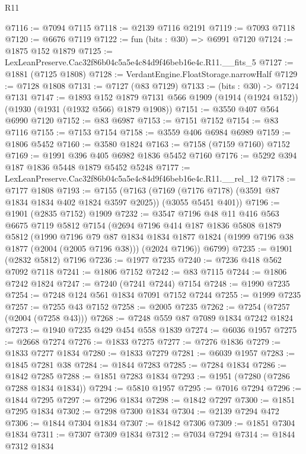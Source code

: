 \begin{lexlean}{R11}
\begin{coremodule}
@7116 := @7094 @7115
@7118 := @2139 @7116 @2191
@7119 := @7093 @7118
@7120 := @6676 @7119
@7122 := fun (bits : @30) => @6991 @7120
@7124 := @1875 @152 @1879
@7125 := LexLeanPreserve.Cac32f86b04c5a5e4c84d9f46beb16e4c.R11.__fits_5
@7127 := @1881 (@7125 @1808)
@7128 := VerdantEngine.FloatStorage.narrowHalf
@7129 := @7128 @1808
@7131 := @7127 (@83 @7129)
@7133 := (bits : @30) -> @7124 @7131
@7147 := @1893
    @152
    @1879
    @7131
    @566
    @1909
    (@1914 (@1924 @152))
    (@1930 (@1931 (@1932 @566) @1879 @1908))
@7151 := @3550 @407 @564 @6990 @7120
@7152 := @83 @6987
@7153 := @7151 @7152
@7154 := @83 @7116
@7155 := @7153 @7154
@7158 := @3559 @406 @6984 @6989
@7159 := @1806 @5452
@7160 := @3580 @1824
@7163 := @7158 (@7159 @7160) @7152
@7169 := @1991 @396 @405 @6982 @1836 @5452 @7160
@7176 := @5292 @394 @187 @1836 @5448 @1879 @5452 @5248
@7177 := LexLeanPreserve.Cac32f86b04c5a5e4c84d9f46beb16e4c.R11.__rel_12
@7178 := @7177 @1808
@7193 := @7155
    (@7163 (@7169 (@7176 @7178) (@3591 @87 @1834 @1834 @402 @1824 @3597 @2025)) (@3055 @5451 @401))
@7196 := @1901 (@2835 @7152) @1909
@7232 := @3547
    @7196
    @48
    @11
    @416
    @563
    @6675
    @7119
    @5812
    @7154
    (@2694
      @7196
      @414
      @187
      @1836
      @5808
      @1879
      @5812
      (@1990
        @7196
        @79
        @87
        @1834
        @1834
        @1877
        @1824
        (@1999 @7196 @38 @1877 (@2004 (@2005 @7196 @38)))
        (@2024 @7196))
      @6799)
@7235 := @1901 (@2832 @5812) @7196
@7236 := @1977 @7235
@7240 := @7236 @418 @562 @7092 @7118
@7241 := @1806 @7152
@7242 := @83 @7115
@7244 := @1806 @7242 @1824
@7247 := @7240 (@7241 @7244) @7154
@7248 := @1990 @7235
@7254 := @7248 @124 @561 @1834 @7091 @7152 @7244
@7255 := @1999 @7235
@7257 := @7255 @43 @7152
@7258 := @2005 @7235
@7262 := @7254 (@7257 (@2004 (@7258 @43)))
@7268 := @7248 @559 @87 @7089 @1834 @7242 @1824
@7273 := @1940 @7235 @429 @454 @558 @1839
@7274 := @6036 @1957
@7275 := @2668 @7274
@7276 := @1833 @7275
@7277 := @7276 @1836
@7279 := @1833 @7277 @1834
@7280 := @1833 @7279
@7281 := @6039 @1957
@7283 := @1845 @7281 @38
@7284 := @1844 @7283
@7285 := @7284 @1834
@7286 := @1842 @7285
@7288 := @1851 @7283 @1834
@7293 := @1951 (@7280 (@7286 @7288 @1834 @1834))
@7294 := @5810 @1957
@7295 := @7016 @7294
@7296 := @1844 @7295
@7297 := @7296 @1834
@7298 := @1842 @7297
@7300 := @1851 @7295 @1834
@7302 := @7298 @7300 @1834
@7304 := @2139 @7294 @472
@7306 := @1844 @7304 @1834
@7307 := @1842 @7306
@7309 := @1851 @7304 @1834
@7311 := @7307 @7309 @1834
@7312 := @7034 @7294
@7314 := @1844 @7312 @1834

\end{coremodule}
\end{lexlean}
